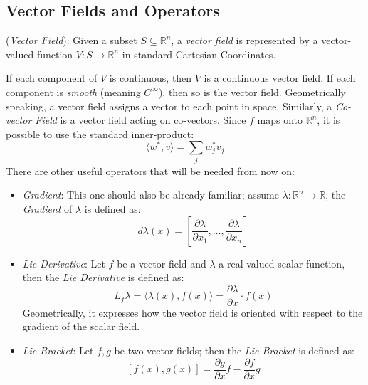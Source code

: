                     \subsection{Vector Fields and Operators}
                        \begin{definition}
                        (\textit{Vector Field}): Given a subset $S\subseteq \mathbb{R}^{n}$, a \textit{vector field} is represented by a vector-valued function $V: S \rightarrow \mathbb{R}^{n}$ in standard Cartesian Coordinates. 
                        \end{definition}
                        If each component of $V$ is continuous, then $V$ is a continuous vector field. If each component is \textit{smooth} (meaning $C^\infty$), then so is the vector field. Geometrically speaking, a vector field assigns a vector to each point in space.
                        Similarly, a \textit{Co-vector Field} is a vector field acting on co-vectors. Since $f$ maps onto $\mathbb{R}^n$, it is possible to use the standard inner-product:
                        \[\langle w^*,v\rangle=\sum_{j}w_{j}^{*}v_j\]
                        There are other useful operators that will be needed from now on:
                        \begin{itemize}
                            \item \textit{Gradient}: This one should also be already familiar; assume $\lambda:\mathbb{R}^n \rightarrow \mathbb{R}$, the \textit{Gradient} of $\lambda$ is defined as:
                            \begin{equation}\label{Gradient}
                                d\lambda(x)=\left[\frac{\partial\lambda}{\partial x_1}, \dots,\frac{\partial\lambda}{\partial x_n}\right]
                            \end{equation}
                            \item \textit{Lie Derivative}: Let $f$ be a vector field and $\lambda$ a real-valued scalar function, then the \textit{Lie Derivative} is defined as:
                            \begin{equation}\label{Lie_Derivative}
                                L_{f}\lambda=\langle\lambda(x),f(x)\rangle=\frac{\partial\lambda}{\partial x}\cdot f(x)               
                            \end{equation}
                            Geometrically, it expresses how the vector field is oriented with respect to the gradient of the scalar field.
                            \item \textit{Lie Bracket}: Let $f,g$ be two vector fields; then the \textit{Lie Bracket} is defined as:                         \begin{equation}\label{Lie_Bracket}                                    \left[f(x),g(x)\right]=\frac{\partial g}{\partial x} f- \frac{\partial f}{\partial x} g 
                            \end{equation}
                            
                        \end{itemize}
